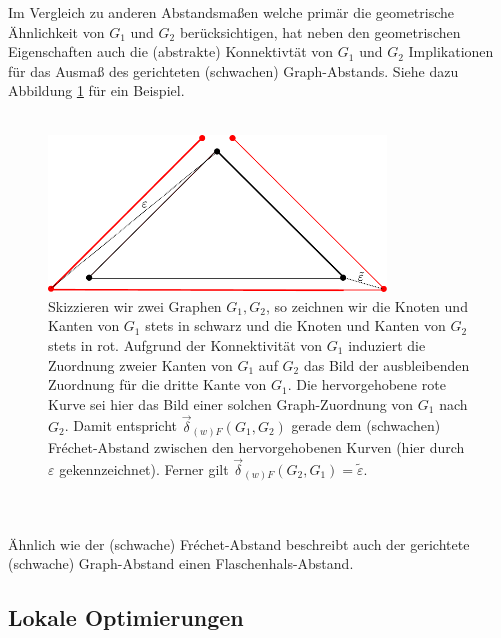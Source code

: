 \documentclass[a4paper, 12pt, twoside]{article}
\theoremstyle{Format1} %
\begin{document}
Im Vergleich zu anderen Abstandsmaßen
welche primär die geometrische Ähnlichkeit von $G_1$ und $G_2$ berücksichtigen, hat neben den geometrischen Eigenschaften auch die (abstrakte) Konnektivtät von $G_1$ und $G_2$
Implikationen für das Ausmaß des gerichteten (schwachen) Graph-Abstands. Siehe dazu Abbildung \ref{chapter_2_example_1} für ein Beispiel.
\\
\\
\begin{figure}[htpb][H]
    \centering
    \includegraphics[width=0.8\textwidth]{chapter_2_example_1.pdf}
	\caption{Skizzieren wir zwei Graphen $G_1,G_2$, so zeichnen wir die Knoten und Kanten von $G_1$ stets in schwarz und die Knoten und Kanten von $G_2$ stets in rot.
	Aufgrund der Konnektivität von $G_1$ induziert die Zuordnung zweier Kanten von $G_1$ auf $G_2$ das Bild der ausbleibenden Zuordnung für die dritte Kante von $G_1$.
	Die hervorgehobene rote Kurve sei hier das Bild einer solchen Graph-Zuordnung von $G_1$ nach $G_2$. Damit entspricht $\vec{\delta}_{(w)F}(G_1,G_2)$ gerade dem (schwachen) Fréchet-Abstand
	zwischen den hervorgehobenen Kurven (hier durch $\varepsilon$ gekennzeichnet). Ferner gilt $\vec{\delta}_{(w)F}(G_2,G_1) = \tilde{\varepsilon}$.
	}
    \label{chapter_2_example_1}
\end{figure}
\\
\\
Ähnlich wie der (schwache) Fréchet-Abstand beschreibt auch der gerichtete (schwache) Graph-Abstand einen Flaschenhals-Abstand.

\subsection{Lokale Optimierungen}
\end{document}
